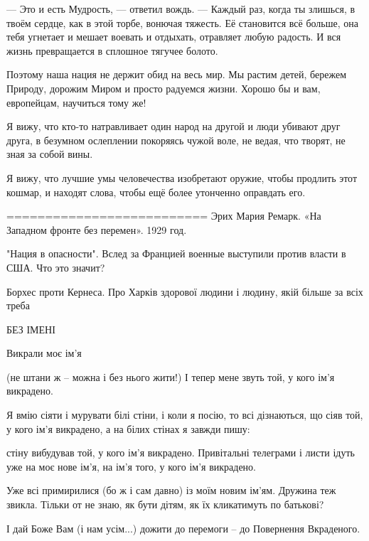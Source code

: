 — Это и есть Мудрость, — ответил вождь. — Каждый раз, когда ты злишься, в твоём
сердце, как в этой торбе, вонючая тяжесть. Её становится всё больше, она тебя
угнетает и мешает воевать и отдыхать, отравляет любую радость. И вся жизнь
превращается в сплошное тягучее болото.

Поэтому наша нация не держит обид на весь мир. Мы растим детей, бережем
Природу, дорожим Миром и просто радуемся жизни. Хорошо бы и вам, европейцам,
научиться тому же!

Я вижу, что кто-то натравливает один народ на другой и люди убивают друг друга, в безумном ослеплении покоряясь чужой воле, не ведая, что творят, не зная за собой вины.

Я вижу, что лучшие умы человечества изобретают оружие, чтобы продлить этот кошмар, и находят слова, чтобы ещё более утонченно оправдать его.

==========================
Эрих Мария Ремарк. «На Западном фронте без перемен». 1929 год.

"Нация в опасности". Вслед за Францией военные выступили против власти в США. Что это значит?

Борхес проти Кернеса. Про Харків здорової людини і людину, якій більше за всіх треба


БЕЗ ІМЕНІ

Викрали моє ім’я

(не штани ж – можна і без нього жити!)
І тепер мене звуть
той, у кого ім’я викрадено.

Я вмію сіяти і мурувати білі стіни,
і коли я посію, то всі дізнаються, що сіяв той,
у кого ім’я викрадено,
а на білих стінах я завжди пишу:

стіну вибудував той, у кого ім’я викрадено.
Привітальні телеграми і листи
ідуть уже на моє нове ім’я,
на ім’я того, у кого ім’я викрадено.

Уже всі примирилися (бо ж і сам давно)
із моїм новим ім’ям.
Дружина теж звикла.
Тільки от не знаю, як бути дітям,
як їх кликатимуть по батькові?

І дай Боже Вам (і нам усім...) дожити до перемоги – до Повернення Вкраденого.
